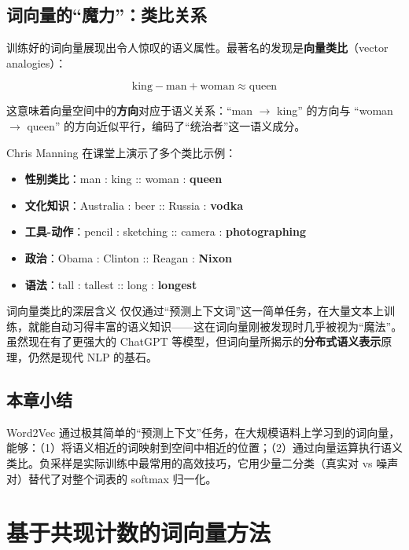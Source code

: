 \documentclass[a4paper]{article}
\begin{document}
\subsection{词向量的``魔力''：类比关系}

训练好的词向量展现出令人惊叹的语义属性。最著名的发现是\textbf{向量类比}（vector analogies）：

$$\text{king} - \text{man} + \text{woman} \approx \text{queen}$$

这意味着向量空间中的\textbf{方向}对应于语义关系：``man $\to$ king'' 的方向与 ``woman $\to$ queen'' 的方向近似平行，编码了``统治者''这一语义成分。

Chris Manning 在课堂上演示了多个类比示例：

\begin{itemize}
    \item \textbf{性别类比}：man : king :: woman : \textbf{queen}
    \item \textbf{文化知识}：Australia : beer :: Russia : \textbf{vodka}
    \item \textbf{工具-动作}：pencil : sketching :: camera : \textbf{photographing}
    \item \textbf{政治}：Obama : Clinton :: Reagan : \textbf{Nixon}
    \item \textbf{语法}：tall : tallest :: long : \textbf{longest}
\end{itemize}

\begin{importantbox}{词向量类比的深层含义}
仅仅通过``预测上下文词''这一简单任务，在大量文本上训练，就能自动习得丰富的语义知识——这在词向量刚被发现时几乎被视为``魔法''。虽然现在有了更强大的 ChatGPT 等模型，但词向量所揭示的\textbf{分布式语义表示}原理，仍然是现代 NLP 的基石。
\end{importantbox}

\subsection{本章小结}

Word2Vec 通过极其简单的``预测上下文''任务，在大规模语料上学习到的词向量，能够：（1）将语义相近的词映射到空间中相近的位置；（2）通过向量运算执行语义类比。负采样是实际训练中最常用的高效技巧，它用少量二分类（真实对 vs 噪声对）替代了对整个词表的 softmax 归一化。


\section{基于共现计数的词向量方法}
\end{document}
